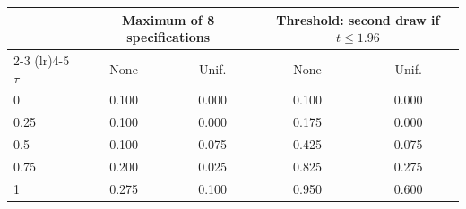 \begin{tabular}{lcccc}
\toprule
 & \multicolumn{2}{c}{Maximum of 8 specifications} & \multicolumn{2}{c}{Threshold: second draw if $t \le 1.96$} \\
\cmidrule(lr){2-3} \cmidrule(lr){4-5}
$\tau$ & None & Unif. & None & Unif. \\
\midrule
0 & 0.100 & 0.000 & 0.100 & 0.000 \\
0.25 & 0.100 & 0.000 & 0.175 & 0.000 \\
0.5 & 0.100 & 0.075 & 0.425 & 0.075 \\
0.75 & 0.200 & 0.025 & 0.825 & 0.275 \\
1 & 0.275 & 0.100 & 0.950 & 0.600 \\
\bottomrule
\end{tabular}
